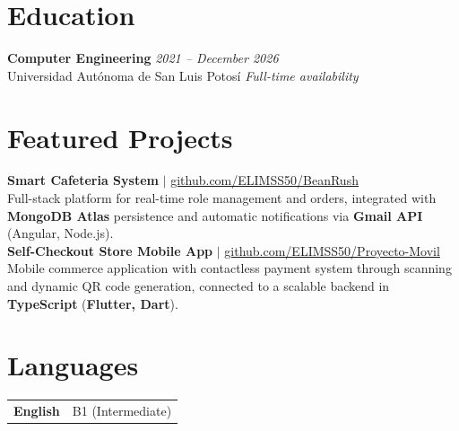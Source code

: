 \documentclass[10pt,a4paper]{article}
\begin{document}
\section{Education}
\noindent\textbf{Computer Engineering} \hfill \textit{2021 -- December 2026} \\
Universidad Autónoma de San Luis Potosí \hfill \textit{Full-time availability} \\[0.05em]

\section{Featured Projects}

\noindent\textbf{Smart Cafeteria System} $|$ \href{https://github.com/ELIMSS50/BeanRush}{github.com/ELIMSS50/BeanRush} \\
Full-stack platform for real-time role management and orders, integrated with \textbf{MongoDB Atlas} persistence and automatic notifications via \textbf{Gmail API} (Angular, Node.js). \\[0em]

\noindent\textbf{Self-Checkout Store Mobile App} $|$ \href{https://github.com/ELIMSS50/Proyecto-Movil}{github.com/ELIMSS50/Proyecto-Movil} \\
Mobile commerce application with contactless payment system through scanning and dynamic QR code generation, connected to a scalable backend in \textbf{TypeScript} (\textbf{Flutter, Dart}).

\section{Languages}
\begin{tabularx}{\textwidth}{@{}l>{\raggedright\arraybackslash}X@{}}
  \textbf{English}  & B1 (Intermediate) \\
\end{tabularx}
\end{document}
